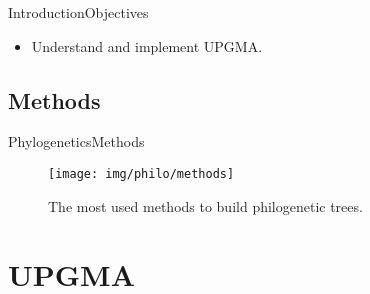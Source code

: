 \documentclass[10pt]{beamer}
\newcommand{\1}{
	\setbeamertemplate{background}{
		\texttt{[image: img/1]}
		\tikz[overlay] \fill[fill opacity=0.75,fill=white] (0,0) rectangle (-\paperwidth,\paperheight);
	}
}
\begin{document}
\begin{frame}{Introduction}{Objectives}
\begin{itemize} 
    \item<1-> Understand and implement UPGMA.
  \end{itemize}
\end{frame}


\subsection{Methods}

\begin{frame}{Phylogenetics}{Methods}
	\begin{figure}
		\texttt{[image: img/philo/methods]}
		\caption{The most used methods to build philogenetic trees.}			
	\end{figure}
\end{frame}

\section{UPGMA}

\end{document}
